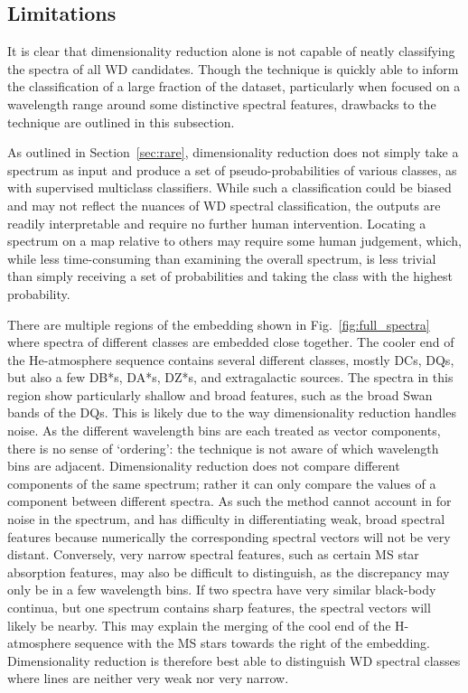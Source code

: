 \documentclass[fleqn,usenatbib]{mnras}
\begin{document}
\subsection{Limitations}

It is clear that dimensionality reduction alone is not capable of neatly classifying the spectra of all WD candidates.
Though the technique is quickly able to inform the classification of a large fraction of the dataset, particularly when focused on a wavelength range around some distinctive spectral features, drawbacks to the technique are outlined in this subsection.

As outlined in Section~\ref{sec:rare}, dimensionality reduction does not simply take a spectrum as input and produce a set of pseudo-probabilities of various classes, as with supervised multiclass classifiers.
While such a classification could be biased and may not reflect the nuances of WD spectral classification, the outputs are readily interpretable and require no further human intervention.
Locating a spectrum on a map relative to others may require some human judgement, which, while less time-consuming than examining the overall spectrum, is less trivial than simply receiving a set of probabilities and taking the class with the highest probability.

There are multiple regions of the embedding shown in Fig.~\ref{fig:full_spectra} where spectra of different classes are embedded close together.
The cooler end of the He-atmosphere sequence contains several different classes, mostly DCs, DQs, but also a few DB*s, DA*s, DZ*s, and extragalactic sources.
The spectra in this region show particularly shallow and broad features, such as the broad  Swan bands of the DQs.
This is likely due to the way dimensionality reduction handles noise.
As the different wavelength bins are each treated as vector components, there is no sense of `ordering': the technique is not aware of which wavelength bins are adjacent.
Dimensionality reduction does not compare different components of the same spectrum; rather it can only compare the values of a component between different spectra.
As such the method cannot account in for noise in the spectrum, and has difficulty in differentiating weak, broad spectral features because numerically the corresponding spectral vectors will not be very distant.
Conversely, very narrow spectral features, such as certain MS star absorption features, may also be difficult to distinguish, as the discrepancy may only be in a few wavelength bins.
If two spectra have very similar black-body continua, but one spectrum contains sharp features, the spectral vectors will likely be nearby.
This may explain the merging of the cool end of the H-atmosphere sequence with the MS stars towards the right of the embedding.
Dimensionality reduction is therefore best able to distinguish WD spectral classes where lines are neither very weak nor very narrow.
\end{document}
